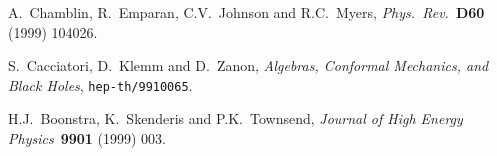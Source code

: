 \documentclass[12pt,a4paper]{article}
\begin{document}
\begin{thebibliography}{99}
 A.~Chamblin, R.~Emparan, C.V.~Johnson  and R.C.~Myers,
                  {\it Phys.~Rev.}~{\bf D60} (1999) 104026.

 S.~Cacciatori, D.~Klemm and D.~Zanon,
                 {\sl {}\coordHE{} Algebras, Conformal Mechanics, 
                 and Black Holes},
                 {\tt hep-th/9910065}.





  H.J.~Boonstra, K.~Skenderis and P.K.~Townsend,
                  {\it Journal of High Energy Physics}~{\bf 9901} 
                  (1999) 003.









\end{thebibliography}
\end{document}
